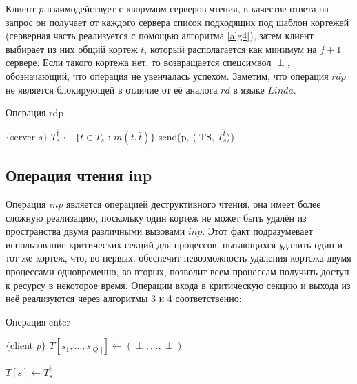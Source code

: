 Клиент $p$ взаимодействует с кворумом серверов чтения, в качестве ответа на запрос он получает от каждого сервера список подходящих под шаблон кортежей (серверная часть реализуется с помощью алгоритма \ref{alg4}), затем клиент выбирает из них общий кортеж $t$, который располагается как минимум на $f + 1$ сервере. Если такого кортежа нет, то возвращается спецсимвол $\perp$, обозначающий, что операция не увенчалась успехом. Заметим, что операция $rdp$ не является блокирующей в отличие от её аналога $rd$ в языке $Linda$.

\begin{algorithm}[H]
	\caption{Операция rdp}\label{alg4}
	\begin{algorithmic}[1]
		\Statex $\{$server $s \}$
		\State $T_s^{\bar t} \gets \{t \in T_s$ : $m(t, \bar t)\}$
		\State send(p, $\langle$ TS, $T_s^{\bar t}\rangle$)
		\EndUpon
	\end{algorithmic}
\end{algorithm}

\subsection{Операция чтения inp}\label{subsec5:3}
Операция $inp$ является операцией деструктивного чтения, она имеет более сложную реализацию, поскольку один кортеж не может быть удалён из пространства двумя различными вызовами $inp$. Этот факт подразумевает использование критических секций для процессов, пытающихся удалить один и тот же кортеж, что, во-первых, обеспечит невозможность удаления кортежа двумя процессами одновременно, во-вторых, позволит всем процессам получить доступ к ресурсу в некоторое время. Операции входа в критическую секцию и выхода из неё реализуются через алгоритмы 3 и 4 соответственно:

\begin{algorithm}[H]
	\caption{Операция enter}\label{alg5}
	\begin{algorithmic}[1]
		\Statex $\{$client $p \}$
		\State $T[s_1, \dots, s_{|Q_r|}] \gets (\perp, \dots, \perp)$
		\State {}
		
		\State {}
		\State $T[s] \gets T_s^{\bar t}$
		\EndFor
		
		\State {}
		\EndIf
		\State \Return{$\perp$}
		\EndFunction
	\end{algorithmic}
\end{algorithm}

